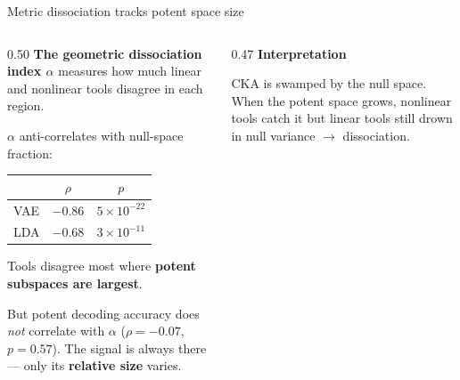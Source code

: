 \documentclass[aspectratio=169,11pt]{beamer}
\begin{document}
\begin{frame}{Metric dissociation tracks potent space size}

\begin{columns}[T]
\begin{column}{0.50\textwidth}
\textbf{The geometric dissociation index $\alpha$} measures how much linear and nonlinear tools disagree in each region.

\vspace{0.5em}
{\small $\alpha$ anti-correlates with null-space fraction:}

\vspace{0.2em}
{\scriptsize
\begin{tabular}{lcc}
\toprule
& $\rho$ & $p$ \\
\midrule
VAE & $-0.86$ & $5 \times 10^{-22}$ \\
LDA & $-0.68$ & $3 \times 10^{-11}$ \\
\bottomrule
\end{tabular}
}

\vspace{0.3em}
{\small Tools disagree most where \textbf{potent subspaces are largest}.}

\vspace{0.3em}
{\small But potent decoding accuracy does \emph{not} correlate with $\alpha$ ($\rho = -0.07$, $p = 0.57$). The signal is always there --- only its \textbf{relative size} varies.}
\end{column}

\begin{column}{0.47\textwidth}
\centering
\vspace{0.5em}
\textbf{Interpretation}

\vspace{0.5em}

\vspace{0.3em}
{\small CKA is swamped by the null space. When the potent space grows, nonlinear tools catch it but linear tools still drown in null variance $\to$ dissociation.}
\end{column}
\end{columns}
\end{frame}
\end{document}
